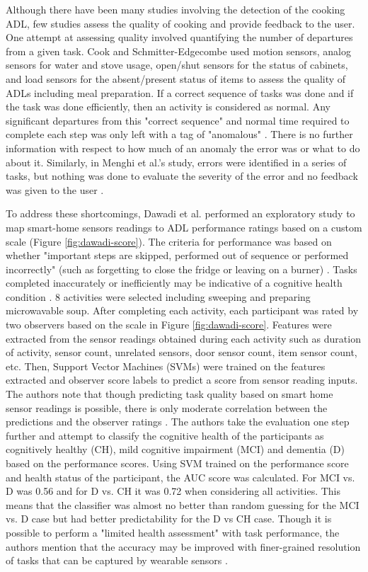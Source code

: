 Although there have been many studies involving the detection of the cooking ADL, few studies assess the quality of cooking and provide feedback to the user. One attempt at assessing quality involved quantifying the number of departures from a given task. Cook and Schmitter-Edgecombe used motion sensors, analog sensors for water and stove usage, open/shut sensors for the status of cabinets, and load sensors for the absent/present status of items to assess the quality of ADLs including meal preparation. If a correct sequence of tasks was done and if the task was done efficiently, then an activity is considered as normal. Any significant departures from this "correct sequence" and normal time required to complete each step was only left with a tag of "anomalous" \cite{cook_assessing_2009}. There is no further information with respect to how much of an anomaly the error was or what to do about it. Similarly, in Menghi et al.'s study, errors were identified in a series of tasks, but nothing was done to evaluate the severity of the error and no feedback was given to the user \cite{mokhtari_smart_2018}. 

To address these shortcomings, Dawadi et al. performed an exploratory study to map smart-home sensors readings to ADL performance ratings based on a custom scale (Figure \ref{fig:dawadi-score}). The criteria for performance was based on whether "important steps are skipped, performed out of sequence or performed incorrectly" (such as forgetting to close the fridge or leaving on a burner) \cite{dawadi_automated_2013}. Tasks completed inaccurately or inefficiently may be indicative of a cognitive health condition \cite{dawadi_automated_2013}. 8 activities were selected including sweeping and preparing microwavable soup. After completing each activity, each participant was rated by two observers based on the scale in Figure \ref{fig:dawadi-score}. Features were extracted from the sensor readings obtained during each activity such as duration of activity, sensor count, unrelated sensors, door sensor count, item sensor count, etc. Then, Support Vector Machines (SVMs) were trained on the features extracted and observer score labels to predict a score from sensor reading inputs. The authors note that though predicting task quality based on smart home sensor readings is possible, there is only moderate correlation between the predictions and the observer ratings \cite{dawadi_automated_2013}. The authors take the evaluation one step further and attempt to classify the cognitive health of the participants as cognitively healthy (CH), mild cognitive impairment (MCI) and dementia (D) based on the performance scores. Using SVM trained on the performance score and health status of the participant, the AUC score was calculated. For MCI vs. D was 0.56 and for D vs. CH it was 0.72 when considering all activities. This means that the classifier was almost no better than random guessing for the MCI vs. D case but had better predictability for the D vs CH case. Though it is possible to perform a "limited health assessment" with task performance, the authors mention that the accuracy may be improved with finer-grained resolution of tasks that can be captured by wearable sensors \cite{dawadi_automated_2013}.

